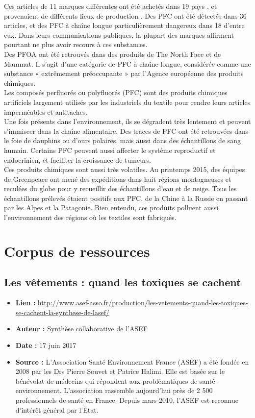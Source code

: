 \documentclass[8pt]{article}
\begin{document}
Ces articles de 11 marques différentes ont été achetés dans 19 pays , et provenaient de différents lieux de production . Des PFC ont été détectés dans 36 articles, et des PFC à chaîne longue particulièrement dangereux dans 18 d’entre eux. Dans leurs communications publiques, la plupart des marques affirment pourtant ne plus avoir recours à ces substances.\\

Des PFOA ont été retrouvés dans des produits de The North Face et de Mammut. Il s’agit d’une catégorie de PFC à chaîne longue, considérée comme une substance « extrêmement préoccupante » par l’Agence européenne des produits chimiques. \\

Les composés perfluorés ou polyfluorés (PFC) sont des produits chimiques artificiels largement utilisés par les industriels du textile pour rendre leurs articles imperméables et antitaches.\\

Une fois présents dans l’environnement, ils se dégradent très lentement et peuvent s’immiscer dans la chaîne alimentaire. Des traces de PFC ont été retrouvées dans le foie de dauphins ou d’ours polaires, mais aussi dans des échantillons de sang humain. Certains PFC peuvent aussi affecter le système reproductif et endocrinien, et faciliter la croissance de tumeurs.\\

Ces produits chimiques sont aussi très volatiles. Au printemps 2015, des équipes de Greenpeace ont mené des expéditions dans huit régions montagneuses et reculées du globe pour y recueillir des échantillons d’eau et de neige. Tous les échantillons prélevés étaient positifs aux PFC, de la Chine à la Russie en passant par les Alpes et la Patagonie. Bien entendu, ces produits polluent aussi l’environnement des régions où les textiles sont fabriqués.

\newpage
\section{Corpus de ressources}
\subsection{Les vêtements : quand les toxiques se cachent}
 
\begin{itemize}
	\item \textbf{Lien : }  \url{http://www.asef-asso.fr/production/les-vetements-quand-les-toxiques-se-cachent-la-synthese-de-lasef/} 
	\item \textbf{Auteur : } Synthèse collaborative de l'ASEF
	\item \textbf{Date : } 17 juin 2017
	\item \textbf{Source : } L’Association Santé Environnement France (ASEF) a été fondée en 2008 par les Drs Pierre Souvet et Patrice Halimi. Elle est basée sur le bénévolat de médecins qui répondent aux problématiques de santé-environnement. L'association rassemble aujourd'hui près de 2 500 professionnels de santé en France. Depuis mars 2010, l'ASEF est reconnue d'intérêt général par l'État.
\end{itemize}
\end{document}
